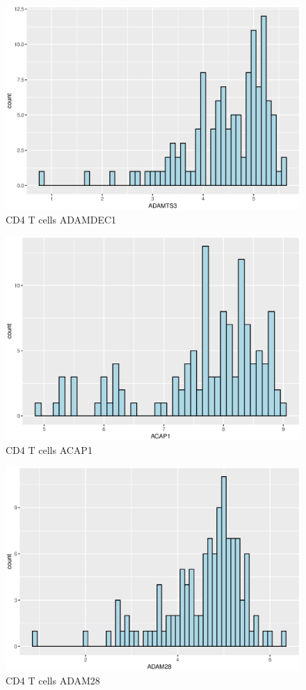 \documentclass{article}
\begin{document}
\begin{figure}[H]
     \centering
     \includegraphics[width=5in]{CD4T_ADAMDEC1_log.eps}
     \caption{CD4 T cells ADAMDEC1}
     \label{fig:my_label}
\end{figure}
\begin{figure}[H]
     \centering
     \includegraphics[width=5in]{pic/CD4T_ACAP1_log.eps}
     \caption{CD4 T  cells ACAP1}
     \label{fig:my_label}
\end{figure}
\begin{figure}[H]
     \centering
     \includegraphics[width=5in]{CD4T_ADAM28_log.eps}
     \caption{CD4 T cells ADAM28}
     \label{fig:my_label}
\end{figure}
\end{document}
